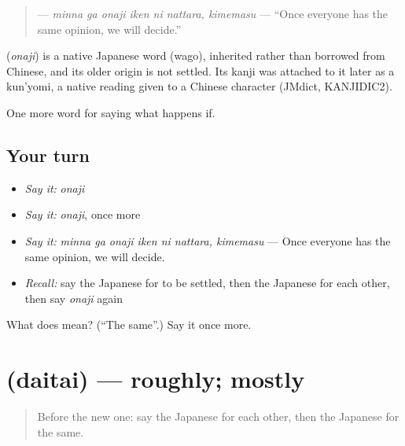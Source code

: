 \begin{quote}
\textbf{   } — \emph{minna ga onaji iken ni nattara, kimemasu} — \textquotedblleft{}Once everyone has the same opinion, we will decide.\textquotedblright{}
\end{quote}

\begin{cousinweb}
\textbf{} (\emph{onaji}) is a native Japanese word (wago), inherited rather than borrowed from Chinese, and its older origin is not settled. Its kanji was attached to it later as a kun'yomi, a native reading given to a Chinese character (JMdict, KANJIDIC2).
\end{cousinweb}

\begin{grammarlens}[title={What you've built}]
One more word for saying what happens if.
\end{grammarlens}

\subsection*{Your turn}
\begin{itemize}
\raggedright
  \item \emph{Say it:} \emph{onaji}
  \item \emph{Say it:} \emph{onaji}, once more
  \item \emph{Say it:} \emph{minna ga onaji iken ni nattara, kimemasu} — Once everyone has the same opinion, we will decide.
  \item \emph{Recall:} say the Japanese for to be settled, then the Japanese for each other, then say \emph{onaji} again
\end{itemize}

\begin{tcolorbox}[breakable,colback=teal!4,colframe=teal!35!black,title={Before you move on}]
What does  mean? (\textquotedblleft{}The same\textquotedblright{}.) Say it once more.
\end{tcolorbox}
\section[\texorpdfstring{\ja{だいたい} (daitai)}{だいたい (daitai)}]{ (daitai) — roughly; mostly}

\label{lesson:JA-C370-daitai}



\begin{quote}
Before the new one: say the Japanese for each other, then the Japanese for the same.
\end{quote}

